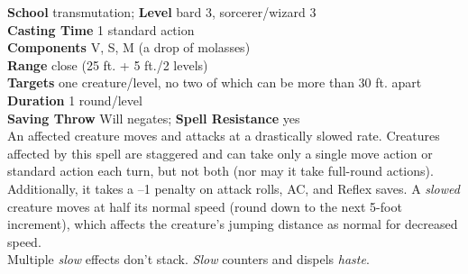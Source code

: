 \textbf{School} transmutation; \textbf{Level} bard 3, sorcerer/wizard 3\\
\textbf{Casting Time} 1 standard action\\
\textbf{Components} V, S, M (a drop of molasses)\\
\textbf{Range} close (25 ft. + 5 ft./2 levels)\\
\textbf{Targets} one creature/level, no two of which can be more than 30 ft. apart\\
\textbf{Duration} 1 round/level\\
\textbf{Saving Throw }Will negates; \textbf{Spell Resistance} yes\\
An affected creature moves and attacks at a drastically slowed rate. Creatures affected by this spell are staggered and can take only a single move action or standard action each turn, but not both (nor may it take full-round actions). Additionally, it takes a --1 penalty on attack rolls, AC, and Reflex saves. A \textit{slowed }creature moves at half its normal speed (round down to the next 5-foot increment), which affects the creature's jumping distance as normal for decreased speed.\\
Multiple \textit{slow }effects don't stack. \textit{Slow }counters and dispels \textit{haste}.\\
